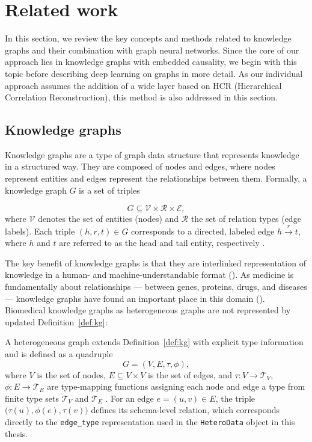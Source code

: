 \newpage %
\section{Related work}

In this section, we review the key concepts and methods related to knowledge graphs 
and their combination with graph neural networks. 
Since the core of our approach lies in knowledge graphs with embedded causality, 
we begin with this topic before describing deep learning on graphs in more detail. 
As our individual approach assumes the addition of a wide layer based on HCR 
(Hierarchical Correlation Reconstruction), this method is also addressed in this section.

\subsection{Knowledge graphs}

Knowledge graphs are a type of graph data structure that represents
knowledge in a structured way. They are composed of nodes and edges,
where nodes represent entities and edges represent the relationships
between them. Formally, a knowledge graph $G$ is a set of triples

\begin{definition}
\label{def:kg}
$$G \subseteq \mathcal{V} \times \mathcal{R} \times \mathcal{E},$$
where $\mathcal{V}$ denotes the set of entities (nodes) and $\mathcal{R}$
the set of relation types (edge labels). Each triple $(h, r, t) \in G$
corresponds to a directed, labeled edge $h \xrightarrow{r} t$, where $h$
and $t$ are referred to as the head and tail entity, respectively
\textcite{hogan2021knowledge}.
\end{definition}

The key benefit of knowledge graphs is that they are interlinked representation
of knowledge in a
human- and machine-understandable format (\textcite{barrasa2023building}). As
medicine is fundamentally about relationships — between genes, proteins,
drugs, and diseases — knowledge graphs have found an important place in
this domain (\textcite{maclean2021knowledge}). Biomedical knowledge graphs as
heterogeneous graphs
are not represented by updated Definition~\ref{def:kg}:

\begin{definition}
\label{def:heterokg}
A heterogeneous graph extends Definition~\ref{def:kg} with explicit type
information and is defined as a quadruple
$$G = (V, E, \tau, \phi),$$
where $V$ is the set of nodes, $E \subseteq V \times V$ is the set of
edges, and $\tau: V \rightarrow \mathcal{T}_V$, $\phi: E \rightarrow
\mathcal{T}_E$ are type-mapping functions assigning each node and edge a
type from finite type sets $\mathcal{T}_V$ and $\mathcal{T}_E$
\cite{hu2020heterogeneous}. For an edge $e = (u, v) \in E$, the triple
$\bigl(\tau(u), \phi(e), \tau(v)\bigr)$ defines its schema-level relation,
which corresponds directly to the \texttt{edge\_type} representation used
in the \texttt{HeteroData} object in this thesis.
\end{definition}

